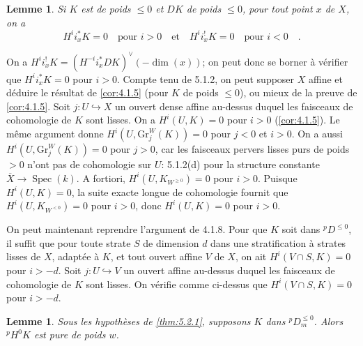 \documentclass[12pt,a4paper]{article}
\theoremstyle{plain}
\newtheorem{lemma}[theorem]{Lemme}
\theoremstyle{definition}
\DeclareMathOperator{\Spec}{Spec}
\newcommand{\into}{\hookrightarrow}
\providecommand{\Spec}{\operatorname{Spec}}
\begin{document}
\begin{lemma}\label{lem:5.2.2}
Si $K$ est de poids $\leq 0$ et $DK$ de poids $\leq 0$, pour tout point $x$ de $X$, on a
\[
H^{i}i_{x}^{*}K = 0 \quad \text{pour } i > 0 \quad \text{et} \quad H^{i}i_{x}^{!}K = 0 \quad \text{pour } i < 0\quad.
\]
\end{lemma}

On a $H^{i}i_{x}^{!}K = (H^{-i}i_{x}^{*}DK)^{\vee}(-\dim(x))$; on peut donc se borner \`{a} v\'{e}rifier que $H^{i}i_{x}^{*}K = 0$ pour $i > 0$. Compte tenu de 5.1.2, on peut supposer $X$ affine et d\'{e}duire le r\'{e}sultat de \ref{cor:4.1.5} (pour $K$ de poids $\leq 0$), ou mieux de la preuve de \ref{cor:4.1.5}. Soit $j: U \into X$ un ouvert dense affine au-dessus duquel les faisceaux de cohomologie de $K$ sont lisses. On a $H^{i}(U, K) = 0$ pour $i > 0$ (\ref{cor:4.1.5}). Le m\^{e}me argument donne $H^{i}(U, \mathrm{Gr}_{j}^{W}(K)) = 0$ pour $j < 0$ et $i > 0$. On a aussi $H^{i}(U, \mathrm{Gr}_{j}^{W}(K)) = 0$ pour $j > 0$, car les faisceaux pervers lisses purs de poids $> 0$ n'ont pas de cohomologie sur $U$: 5.1.2(d) pour la structure constante $\overline{X} \to \Spec(k)$. A fortiori, $H^{i}(U, K_{W^{\geq 0}}) = 0$ pour $i > 0$. Puisque $H^{i}(U, K) = 0$, la suite exacte longue de cohomologie fournit que $H^{i}(U, K_{W^{<0}}) = 0$ pour $i > 0$, donc $H^{i}(U, K) = 0$ pour $i > 0$.

On peut maintenant reprendre l'argument de 4.1.8. Pour que $K$ soit dans ${}^{p}D^{\leq 0}$, il suffit que pour toute strate $S$ de dimension $d$ dans une stratification \`{a} strates lisses de $X$, adapt\'{e}e \`{a} $K$, et tout ouvert affine $V$ de $X$, on ait $H^{i}(V \cap S, K) = 0$ pour $i > -d$. Soit $j: U \into V$ un ouvert affine au-dessus duquel les faisceaux de cohomologie de $K$ sont lisses. On v\'{e}rifie comme ci-dessus que $H^{i}(V \cap S, K) = 0$ pour $i > -d$.

\begin{lemma}\label{lem:5.2.3}
Sous les hypoth\`{e}ses de \ref{thm:5.2.1}, supposons $K$ dans ${}^{p}D_{m}^{\leq 0}$. Alors ${}^{p}H^{0}K$ est pure de poids $w$.
\end{lemma}
\end{document}
